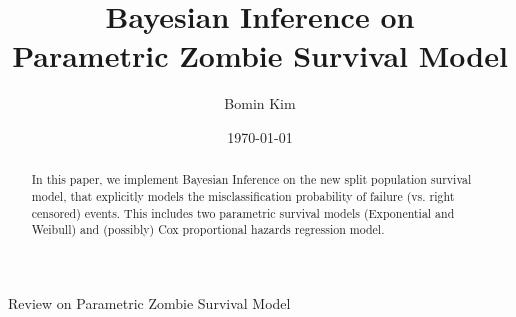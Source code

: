 \documentclass[a4paper, 12pt]{article}
\makeatletter
\renewcommand{\section}{\@startsection
	{section}    {1}    {0mm}    {-0.7\baselineskip}    {0.08\baselineskip}    {\normalfont\large\sc\center\bf}}
\makeatother
\begin{document}
\date{\today }
\title{Bayesian Inference on \\Parametric Zombie Survival Model}
\author{Bomin Kim}
\maketitle
{}
\begin{abstract}
	\noindent In this paper, we implement Bayesian Inference on the new split population survival model, that explicitly models the misclassification probability of failure (vs. right censored) events. This includes two parametric survival models (Exponential and Weibull) and (possibly) Cox proportional hazards regression model. 
\end{abstract}
\clearpage \pagebreak \renewcommand{\thefigure}{\arabic{figure}} %
\setcounter{figure}{0} \renewcommand{\thepage}{\arabic{page}} %
\setcounter{page}{1} \pagestyle{plain} \doublespacing
\section{Review on Parametric Zombie Survival Model}
\end{document}
